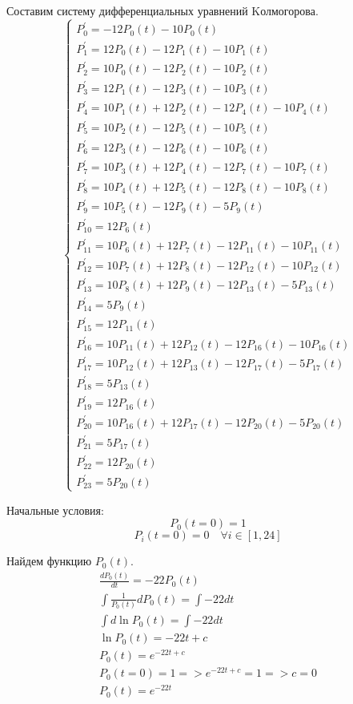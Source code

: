 Составим систему дифференциальных уравнений Kолмогорова.
\[
\begin{cases}
    P^\prime_{0} =-12P_{0} (t) -10P_{0} (t) \\ 
P^\prime_{1} = 12P_{0} (t) -12P_{1} (t) -10P_{1} (t) \\ 
P^\prime_{2} = 10P_{0} (t) -12P_{2} (t) -10P_{2} (t) \\ 
P^\prime_{3} = 12P_{1} (t) -12P_{3} (t) -10P_{3} (t) \\ 
P^\prime_{4} = 10P_{1} (t) +12P_{2} (t) -12P_{4} (t) -10P_{4} (t) \\ 
P^\prime_{5} = 10P_{2} (t) -12P_{5} (t) -10P_{5} (t) \\ 
P^\prime_{6} = 12P_{3} (t) -12P_{6} (t) -10P_{6} (t) \\ 
P^\prime_{7} = 10P_{3} (t) +12P_{4} (t) -12P_{7} (t) -10P_{7} (t) \\ 
P^\prime_{8} = 10P_{4} (t) +12P_{5} (t) -12P_{8} (t) -10P_{8} (t) \\ 
P^\prime_{9} = 10P_{5} (t) -12P_{9} (t) -5P_{9} (t) \\ 
P^\prime_{10} = 12P_{6} (t) \\ 
P^\prime_{11} = 10P_{6} (t) +12P_{7} (t) -12P_{11} (t) -10P_{11} (t) \\ 
P^\prime_{12} = 10P_{7} (t) +12P_{8} (t) -12P_{12} (t) -10P_{12} (t) \\ 
P^\prime_{13} = 10P_{8} (t) +12P_{9} (t) -12P_{13} (t) -5P_{13} (t) \\ 
P^\prime_{14} = 5P_{9} (t) \\ 
P^\prime_{15} = 12P_{11} (t) \\ 
P^\prime_{16} = 10P_{11} (t) +12P_{12} (t) -12P_{16} (t) -10P_{16} (t) \\ 
P^\prime_{17} = 10P_{12} (t) +12P_{13} (t) -12P_{17} (t) -5P_{17} (t) \\ 
P^\prime_{18} = 5P_{13} (t) \\ 
P^\prime_{19} = 12P_{16} (t) \\ 
P^\prime_{20} = 10P_{16} (t) +12P_{17} (t) -12P_{20} (t) -5P_{20} (t) \\ 
P^\prime_{21} = 5P_{17} (t) \\ 
P^\prime_{22} = 12P_{20} (t) \\ 
P^\prime_{23} = 5P_{20} (t) 
\end{cases}
\]

Начальные условия:
$$P_0(t=0)=1$$
$$P_i(t=0)=0 \quad \forall i \in [1, 24]$$

Найдем функцию $P_0(t)$.
\begin{gather*}
    \frac{dP_0(t)}{dt} = -22 P_0 (t)\\
    \int \frac{1}{P_0 (t)} d P_0(t) = \int -22 dt\\
    \int d \ln P_0 (t) = \int -22 dt\\
    \ln P_0 (t) = -22 t + c\\
    P_0 (t) = e^{-22 t + c}\\
    P_0(t = 0) = 1 => e^{-22 t + c} = 1 => c = 0\\
    P_0 (t) = e^{-22 t}\\
\end{gather*}

